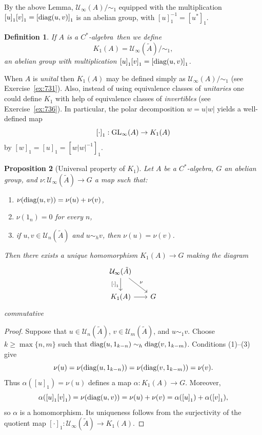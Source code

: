 \documentclass{book}
\newtheorem{definition}{Definition}[section]
\newtheorem{proposition}[definition]{Proposition}
\def\cstar{\(C^*\)-algebra}
\def\diag{\textnormal{diag}}
\begin{document}
By the above Lemma, \(\mathcal{U}_\infty(A)/\sim_1\) equipped with the multiplication \({[u]}_1{[v]}_1={[\textnormal{diag}(u,v)]}_1\) is an abelian group,
with \({[u]}_1^{-1}={[u^*]}_1\).
\begin{definition}
  If \(A\) is a \cstar\ then we define 
  \[
    K_1(A)=\mathcal{U}_\infty(\tilde{A})/\sim_1,
  \]
  an abelian group with multiplication \({[u]}_1{[v]}_1={[\textnormal{diag}(u,v)]}_1\).
\end{definition}
When \(A\) is \textit{unital} then \(K_1(A)\) may be defined simply as \(\mathcal{U}_\infty(A)/\sim_1\) (see Exercise~\ref{ex:731}).
Also, instead of using equivalence classes of \textit{unitaries} one could define \(K_1\) with help of equivalence classes of
\textit{invertibles} (see Exercise~\ref{ex:736}). In particular, the polar decomposition \(w=u|w|\) yields a well-defined map
\[
  {[\cdot]}_1:\textnormal{GL}_\infty(A)\rightarrow K_1(A)
\]
by \({[w]}_1={[u]}_1={[w|w|^{-1}]}_1\).
\begin{proposition}[Universal property of \(K_1\)]\label{prop:713}
  Let \(A\) be a \cstar, \(G\) an abelian group, and \(\nu:\mathcal{U}_\infty(\tilde{A})\rightarrow G\) a map such that:
  \begin{enumerate}
    \item \(\nu(\diag(u,v))=\nu(u)+\nu(v)\),
    \item \(\nu(1_n)=0\) for every \(n\),
    \item if \(u,v\in\mathcal{U}_n(\tilde{A})\) and \(u\sim_h v\), then \(\nu(u)=\nu(v)\).
  \end{enumerate}
  Then there exists a unique homomorphism \(K_1(A)\rightarrow G\) making the diagram
  \begin{equation}\label{diagUP:711}
    \begin{tikzcd}[column sep=scriptsize]
    \mathcal{U}_\infty(\tilde{A}) \arrow{d}[swap]{{[\cdot]}_1} \arrow{rd}{\nu}&\\
    K_1(A)\arrow{r}[swap]{} & G 
    \end{tikzcd}
  \end{equation}
  commutative
\end{proposition}
\begin{proof}
  Suppose that \(u\in\mathcal{U}_n(\tilde A)\), \(v\in\mathcal{U}_m(\tilde A)\), and
  \(u\sim_1v\). Choose \(k\geq\max\{n,m\}\) such that
  \(\diag(u,1_{k-n})\sim_h\diag(v,1_{k-m})\). Conditions (1)--(3) give
  \[
    \nu(u)=\nu(\diag(u,1_{k-n}))
    =\nu(\diag(v,1_{k-m}))=\nu(v).
  \]
  Thus \(\alpha({[u]}_1)=\nu(u)\) defines a map \(\alpha:K_1(A)\to G\). Moreover,
  \[
    \alpha({[u]}_1{[v]}_1)
    =\nu(\diag(u,v))=\nu(u)+\nu(v)
    =\alpha({[u]}_1)+\alpha({[v]}_1),
  \]
  so \(\alpha\) is a homomorphism. Its uniqueness follows from the surjectivity of the
  quotient map \({[\cdot]}_1:\mathcal{U}_\infty(\tilde A)\to K_1(A)\).
\end{proof}
\end{document}
